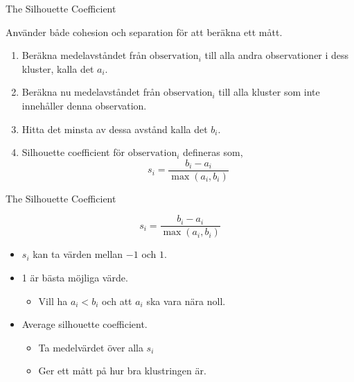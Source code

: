 \documentclass[10pt,english]{beamer}
\begin{document}
\begin{frame}{The Silhouette Coefficient}
    
    Använder både cohesion och separation för att beräkna ett mått.

    \begin{enumerate}
        \item Beräkna medelavståndet från $\text{observation}_i$ till alla andra observationer i dess kluster, kalla det $a_i$.
        \item Beräkna nu medelavståndet från $\text{observation}_i$ till alla kluster som inte innehåller denna observation.
        \item Hitta det minsta av dessa avstånd kalla det $b_i$.
        \item Silhouette coefficient för $\text{observation}_i$ defineras som,
        \begin{equation*}
            s_i = \frac{b_i - a_i}{\max(a_i, b_i)}
        \end{equation*}
    \end{enumerate}

\end{frame}

\begin{frame}{The Silhouette Coefficient}

    \begin{equation*}
        s_i = \frac{b_i - a_i}{\max(a_i, b_i)}
    \end{equation*}

    \begin{itemize}
        \item $s_i$ kan ta värden mellan $-1$ och $1$.
        \item 1 är bästa möjliga värde.
        \begin{itemize}
            \item Vill ha $a_i < b_i$ och att $a_i$ ska vara nära noll.
        \end{itemize}
        \item Average silhouette coefficient.
        \begin{itemize}
            \item Ta medelvärdet över alla $s_i$
            \item Ger ett mått på hur bra klustringen är.
        \end{itemize}
    \end{itemize}
    
\end{frame}
\end{document}
